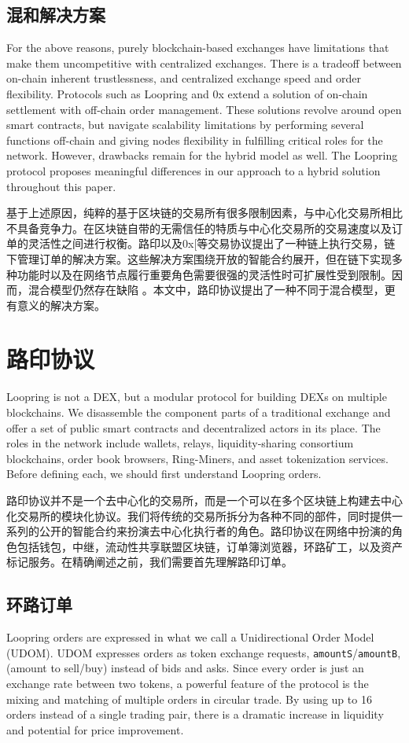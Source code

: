 \documentclass[UTF8,nofonts]{ctexart}
\begin{document}
\begin{multicols}{2}
\subsection{混和解决方案}
For the above reasons, purely blockchain-based exchanges have limitations that make them uncompetitive with centralized exchanges. There is a tradeoff between on-chain inherent trustlessness, and centralized exchange speed and order flexibility. Protocols such as Loopring and 0x  extend a solution of on-chain settlement with off-chain order management. These solutions revolve around open smart contracts, but navigate scalability limitations by performing several functions off-chain and giving nodes flexibility in fulfilling critical roles for the network. However, drawbacks remain for the hybrid model as well. The Loopring protocol proposes meaningful differences in our approach to a hybrid solution throughout this paper.

基于上述原因，纯粹的基于区块链的交易所有很多限制因素，与中心化交易所相比不具备竞争力。在区块链自带的无需信任的特质与中心化交易所的交易速度以及订单的灵活性之间进行权衡。路印以及0x[\cite{warren20170x}等交易协议提出了一种链上执行交易，链下管理订单的解决方案。这些解决方案围绕开放的智能合约展开，但在链下实现多种功能时以及在网络节点履行重要角色需要很强的灵活性时可扩展性受到限制。因而，混合模型仍然存在缺陷 \cite{costofdecent}。本文中，路印协议提出了一种不同于混合模型，更有意义的解决方案。


\section{路印协议\label{sec:loopring_protocol}}
Loopring is not a DEX, but a modular protocol for building DEXs on multiple blockchains. We disassemble the component parts of a traditional exchange and offer a set of public smart contracts and decentralized actors in its place. The roles in the network include wallets, relays, liquidity-sharing consortium blockchains, order book browsers, Ring-Miners, and asset tokenization services. Before defining each, we should first understand Loopring orders. 

路印协议并不是一个去中心化的交易所，而是一个可以在多个区块链上构建去中心化交易所的模块化协议。我们将传统的交易所拆分为各种不同的部件，同时提供一系列的公开的智能合约来扮演去中心化执行者的角色。路印协议在网络中扮演的角色包括钱包，中继，流动性共享联盟区块链，订单簿浏览器，环路矿工，以及资产标记服务。在精确阐述之前，我们需要首先理解路印订单。

\subsection{环路订单\label{sec:order_ring}}
Loopring orders are expressed in what we call a Unidirectional Order Model (UDOM)\cite{coinport2014udom}. UDOM expresses orders as token exchange requests, \verb|amountS|/\verb|amountB|, (amount to sell/buy)  instead of bids and asks. Since every order is just an exchange rate between two tokens, a powerful feature of the protocol is the mixing and matching of multiple orders in circular trade. By using up to 16 orders instead of a single trading pair, there is a dramatic increase in liquidity and potential for price improvement. 


\end{multicols}
\end{document}
